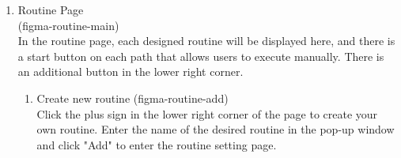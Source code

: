 \begin{enumerate}[label=\arabic*.]
    \item {\large{Routine Page}}\\
                    (figma-routine-main)\\
          In the routine page, each designed routine will be displayed here, and there is a start button on each path that allows users to execute manually. There is an additional button in the lower right corner.\\
          \begin{enumerate}[label=\alph*]
              \item Create new routine
                    (figma-routine-add)\\
                    Click the plus sign in the lower right corner of the page to create your own routine. Enter the name of the desired routine in the pop-up window and click "Add" to enter the routine setting page.\\



\end{enumerate}
\end{enumerate}
